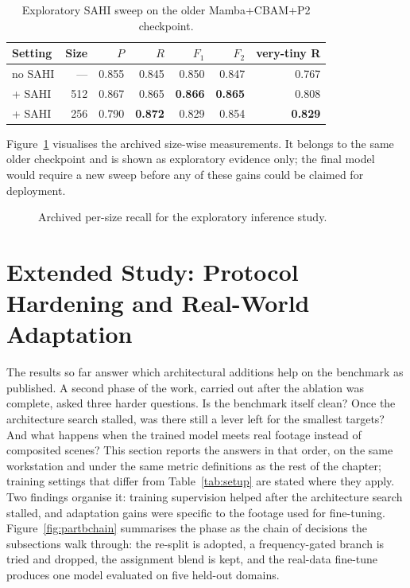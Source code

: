 \begin{table}[tbp]
  \centering
  \caption{Exploratory SAHI sweep on the older Mamba+CBAM+P2 checkpoint.}
  \label{tab:sahi}
  \setlength{\tabcolsep}{5pt}
  \begin{tabular}{@{}l r r r r r r@{}}
    \toprule
    Setting & Size & $P$ & $R$ & $F_1$ & $F_2$ & very-tiny R \\
    \midrule
    no SAHI & --- & 0.855 & 0.845 & 0.850 & 0.847 & 0.767 \\
    + SAHI  & 512 & 0.867 & 0.865 & \textbf{0.866} & \textbf{0.865} & 0.808 \\
    + SAHI  & 256 & 0.790 & \textbf{0.872} & 0.829 & 0.854 & \textbf{0.829} \\
    \bottomrule
  \end{tabular}
\end{table}

Figure~\ref{fig:sahibars} visualises the archived size-wise measurements. It
belongs to the same older checkpoint and is shown as exploratory evidence only;
the final model would require a new sweep before any of these gains could be
claimed for deployment.

\begin{figure}[tbp]
  \centering
  \caption{Archived per-size recall for the exploratory inference study.}
  \label{fig:sahibars}
\end{figure}

\section{Extended Study: Protocol Hardening and Real-World Adaptation}
\label{sec:partb}
The results so far answer which architectural additions help on the benchmark
as published. A second phase of the work, carried out after the ablation was
complete, asked three harder questions. Is the benchmark itself clean? Once the
architecture search stalled, was there still a lever left for the smallest
targets? And what happens when the trained model meets real footage instead of
composited scenes? This section reports the answers in that order, on the same
workstation and under the same metric definitions as the rest of the chapter;
training settings that differ from Table~\ref{tab:setup} are stated where they
apply. Two findings organise it: training supervision helped after the
architecture search stalled, and adaptation gains were specific to the footage
used for fine-tuning. Figure~\ref{fig:partbchain} summarises the phase as the chain
of decisions the subsections walk through: the re-split is adopted, a
frequency-gated branch is tried and dropped, the assignment blend is kept,
and the real-data fine-tune produces one model evaluated on five held-out
domains.

